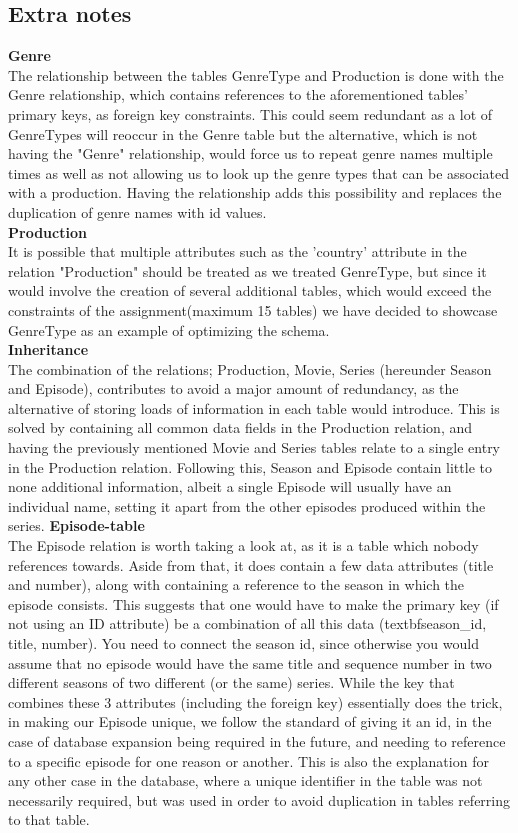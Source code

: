 \subsection{Extra notes}
\large\textbf{Genre}\\\normalsize
The relationship between the tables GenreType and Production is done with the Genre relationship, which contains references to the aforementioned tables' primary keys, as foreign key constraints. This could seem redundant as a lot of GenreTypes will reoccur in the Genre table but the alternative, which is not having the "Genre" relationship, would force us to repeat genre names multiple times as well as not allowing us to look up the genre types that can be associated with a production. Having the relationship adds this possibility and replaces the duplication of genre names with id values.\\
\newline
\large\textbf{Production}\\\normalsize
It is possible that multiple attributes such as the 'country' attribute in the relation "Production" should be treated as we treated GenreType, but since it would involve the creation of several additional tables, which would exceed the constraints of the assignment(maximum 15 tables) we have decided to showcase GenreType as an example of optimizing the schema.\\
\newline
\large\textbf{Inheritance}\\\normalsize
The combination of the relations; Production, Movie, Series (hereunder Season and Episode), contributes to avoid a major amount of redundancy, as the alternative of storing loads of information in each table would introduce. This is solved by containing all common data fields in the Production relation, and having the previously mentioned Movie and Series tables relate to a single entry in the Production relation. Following this, Season and Episode contain little to none additional information, albeit a single Episode will usually have an individual name, setting it apart from the other episodes produced within the series.
\newline
\large\textbf{Episode-table}\\\normalsize
The Episode relation is worth taking a look at, as it is a table which nobody references towards. Aside from that, it does contain a few data attributes (title and number), along with containing a reference to the season in which the episode consists. This suggests that one would have to make the primary key (if not using an ID attribute) be a combination of all this data (textbf{season_id, title, number}). You need to connect the season id, since otherwise you would assume that no episode would have the same title and sequence number in two different seasons of two different (or the same) series. While the key that combines these 3 attributes (including the foreign key) essentially does the trick, in making our Episode unique, we follow the standard of giving it an id, in the case of database expansion being required in the future, and needing to reference to a specific episode for one reason or another.
This is also the explanation for any other case in the database, where a unique identifier in the table was not necessarily required, but was used in order to avoid duplication in tables referring to that table.